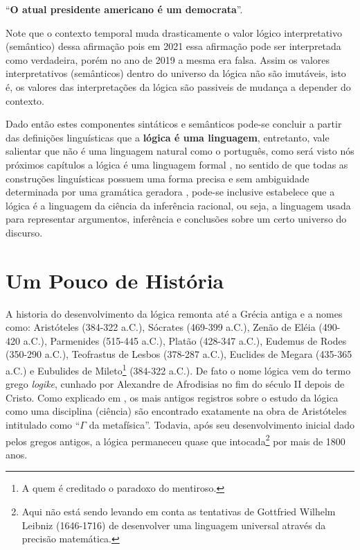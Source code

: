 \begin{center}
	``\textbf{O atual presidente americano é um democrata}''.
\end{center}

Note que o contexto temporal muda drasticamente o valor lógico interpretativo (semântico) dessa afirmação pois em 2021 essa afirmação pode ser interpretada como verdadeira, porém no ano de 2019 a mesma era falsa. Assim os valores interpretativos (semânticos) dentro do universo da lógica não são imutáveis, isto é, os valores das interpretações da lógica são passiveis de mudança a depender do contexto.

Dado então estes componentes sintáticos e semânticos pode-se concluir a partir das definições linguísticas que a \textbf{lógica é uma linguagem}, entretanto, vale salientar que não é uma linguagem natural como o português, como será visto nós próximos capítulos a lógica é uma linguagem formal \cite{benjaLivro2010}, no sentido de que todas as construções linguísticas possuem uma forma precisa e sem ambiguidade determinada por uma gramática geradora \cite{hopcroft2008, linz2006},  pode-se inclusive estabelece que a lógica é a linguagem da ciência da inferência racional, ou seja, a linguagem usada para representar argumentos, inferência e conclusões sobre um certo universo do discurso.

\section{Um Pouco de História}\label{sec:LogicsHistory}

A historia do desenvolvimento da lógica remonta até a Grécia antiga e a nomes como: Aristóteles (384-322 a.C.), Sócrates (469-399 a.C.), Zenão de Eléia (490-420 a.C.), Parmenides (515-445 a.C.), Platão (428-347 a.C.), Eudemus de Rodes (350-290 a.C.), Teofrastus de Lesbos (378-287 a.C.), Euclides de Megara (435-365 a.C.) e  Eubulides de Mileto\footnote{A quem é creditado o paradoxo do mentiroso.} (384-322 a.C.). De fato o nome lógica vem do termo grego \textit{logike}, cunhado por Alexandre de Afrodisias no fim do século II depois de Cristo. Como explicado em \cite{abe2002-logica}, os mais antigos registros sobre o estudo da lógica como uma disciplina (ciência) são encontrado exatamente na obra de Aristóteles intitulado como ``$\Gamma$ da metafísica''. Todavia, após seu desenvolvimento inicial dado pelos gregos antigos, a lógica permaneceu quase que intocada\footnote{Aqui não está sendo levando em conta as tentativas de Gottfried Wilhelm Leibniz (1646-1716) de desenvolver uma linguagem universal através da precisão matemática.} por mais de 1800 anos.

